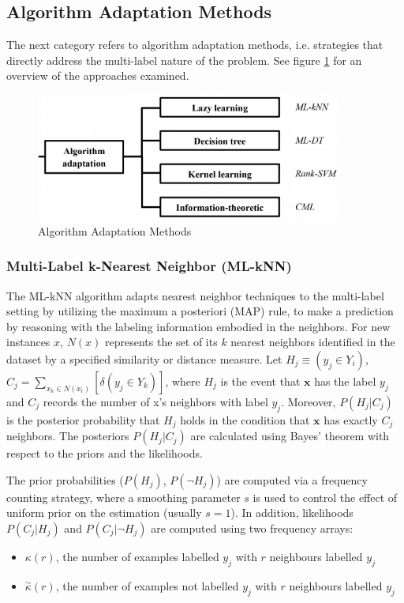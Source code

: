 \documentclass[12pt]{report}
\begin{document}
	\subsection*{Algorithm Adaptation Methods}
  The next category refers to algorithm adaptation methods, i.e. strategies that
  directly address the multi-label nature of the problem. See figure
  \ref{figure:aam} for an overview of the approaches examined.

	
	\begin{figure}[H]
		\centering
		\includegraphics[width=0.9\textwidth]{aa.png}
		\caption{Algorithm Adaptation Methods}
		\centering
    \label{figure:aam}
	\end{figure}

	\subsubsection*{Multi-Label k-Nearest Neighbor (ML-kNN)}
	The ML-kNN algorithm adapts nearest neighbor techniques to the multi-label
  setting by utilizing the maximum a posteriori (MAP) rule, to make a prediction
  by reasoning with the labeling information embodied in the neighbors. For new
  instances $x$, $N(x)$ represents the set of its $k$ nearest neighbors
  identified in the dataset by a specified similarity or distance measure. Let
  $H_j \equiv (y_j \in Y_i)$, $C_j = \sum_{x_k \in N(x_i)} [\delta(y_j \in
  Y_k)]$, where $H_j$ is the event that $\textbf{x}$ has the label $y_j$ and
  $C_j$ records the number of x’s neighbors with label $y_j$. Moreover,
  $P(H_j|C_j)$ is the posterior probability that $H_j$ holds in the condition
  that $\textbf{x}$ has exactly $C_j$ neighbors. The posteriors $P(H_j|C_j)$ are
  calculated using Bayes' theorem with respect to the priors and the likelihoods.

	The prior probabilities ($P(H_j)$, $P(\neg H_j)$) are computed via a frequency counting strategy, where a smoothing parameter $s$ is used to control the effect of uniform prior on the estimation (usually $s=1$). In addition, likelihoods $P(C_j|H_j)$ and $P(C_j| \neg H_j)$ are computed using two frequency arrays:
	\begin{itemize}
		\item $\kappa(r)$, the number of examples labelled $y_j$ with $r$ neighbours labelled $y_j$
		\item $\overset{\sim}{\kappa}(r)$, the number of examples not labelled $y_j$ with $r$ neighbours labelled $y_j$
	\end{itemize}
	 
\end{document}

